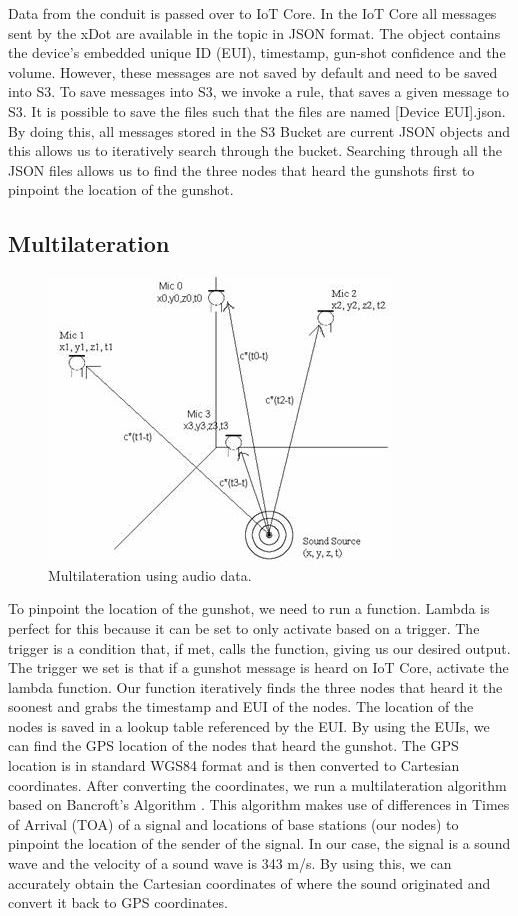 \documentclass[conference]{IEEEtran}
\begin{document}
Data from the conduit is passed over to IoT Core. In the IoT Core all messages sent by the xDot are available in the topic in JSON format. The object contains the device’s embedded unique ID (EUI), timestamp, gun-shot confidence and the volume. However, these messages are not saved by default and need to be saved into S3. To save messages into S3, we invoke a rule, that saves a given message to S3. It is possible to save the files such that the files are named [Device EUI].json. By doing this, all messages stored in the S3 Bucket are current JSON objects and this allows us to iteratively search through the bucket. Searching through all the JSON files allows us to find the three nodes that heard the gunshots first to pinpoint the location of the gunshot.

\subsection {Multilateration}

\begin{figure}[htbp]
\centerline{\includegraphics[width=0.7\columnwidth]{triangulate.png}}
\caption{Multilateration using audio data.}
\label{fig}
\end{figure}
To pinpoint the location of the gunshot, we need to run a function. Lambda is perfect for this because it can be set to only activate based on a trigger. The trigger is a condition that, if met, calls the function, giving us our desired output. The trigger we set is that if a gunshot message is heard on IoT Core, activate the lambda function. Our function iteratively finds the three nodes that heard it the soonest and grabs the timestamp and EUI of the nodes. The location of the nodes is saved in a lookup table referenced by the EUI. By using the EUIs, we can find the GPS location of the nodes that heard the gunshot. The GPS location is in standard WGS84 format and is then converted to Cartesian coordinates. After converting the coordinates, we run a multilateration algorithm based on Bancroft’s Algorithm \cite{b5}. This algorithm makes use of differences in Times of Arrival (TOA) of a signal and locations of base stations (our nodes) to pinpoint the location of the sender of the signal. In our case, the signal is a sound wave and the velocity of a sound wave is 343 m/s. By using this, we can accurately obtain the Cartesian coordinates of where the sound originated and convert it back to GPS coordinates.
\end{document}
